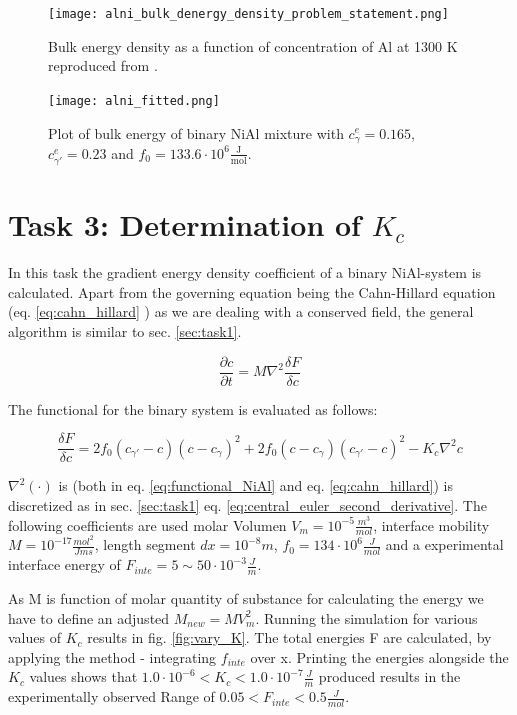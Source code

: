 \begin{figure}[htb]
	\centering\texttt{[image: alni\_bulk\_denergy\_density\_problem\_statement.png]}
	\caption{Bulk energy density as a function of concentration of Al at 1300 K reproduced from \cite{zaisera}.}
	\label{fig:AlNi_problem_statement}
\end{figure}

\begin{figure}[htb]
	\centering
	\texttt{[image: alni\_fitted.png]}
	\caption{Plot of bulk energy of binary NiAl mixture with \(c_{\gamma}^{e} = 0.165\),  \(c_{\gamma '}^{e} = 0.23\) and \(f_{0} = 133.6 \cdot 10^{6} \frac{\mathrm{J}}{\mathrm{mol}} \).}
	\label{fig:alni_fitted}
\end{figure}



\section{Task 3: Determination of \(K_{c}\) }
In this task the gradient energy density coefficient of a binary NiAl-system is calculated. Apart from the governing equation being the Cahn-Hillard equation (eq. \ref{eq:cahn_hillard} ) as we are dealing with a conserved field, the general algorithm is similar to sec. \ref{sec:task1}. 

\begin{equation}
	\frac{ \partial c}{ \partial t} = M \nabla^{2} \frac{\delta F}{\delta c} \label{eq:cahn_hillard}
\end{equation} 

The functional for the binary system is evaluated as follows:

\begin{equation}
	\frac{\delta F}{\delta c} = 2 f_{0}(c_{\gamma '} - c )(c - c_{\gamma})^2 + 2 f_{0} (c - c_{\gamma})(c_{\gamma '} - c )^{2} - K_{c} \nabla^{2} c  \label{eq:functional_NiAl}
\end{equation}
		
\(\nabla^{2}(\cdot)\) is (both in eq. \ref{eq:functional_NiAl} and eq. \ref{eq:cahn_hillard}) is discretized as in sec. \ref{sec:task1} eq. \ref{eq:central_euler_second_derivative}.  The following coefficients are used molar Volumen \(V_{m} = 10^{-5} \frac{m^{3}}{mol}\), interface mobility \(M = 10^{-17} \frac{mol^{2}}{J m s}\), length segment \(dx = 10^{-8} m\), \(f_{0} = 134 \cdot 10^{6} \frac{J}{mol}\) and a experimental interface energy of \( F_{inte} = 5 \sim 50 \cdot 10^{-3} \frac{J}{m}\). 

As M is function of molar quantity of substance for calculating the energy we have to define an adjusted \( M_{new} = M V_{m}^{2}\). Running the simulation for various values of \(K_{c}\) results in fig. \ref{fig:vary_K}. The total energies F are calculated, by applying the  method - integrating \(f_{inte}\) over x.  Printing the energies alongside the \(K_{c}\) values shows that \( 1. 0 \cdot 10^{-6} < K_{c} < 1.0 \cdot 10^{-7} \frac{J}{m}\) produced results in the experimentally observed Range of \( 0.05 < F_{inte} < 0.5 \frac{J}{mol}\).

